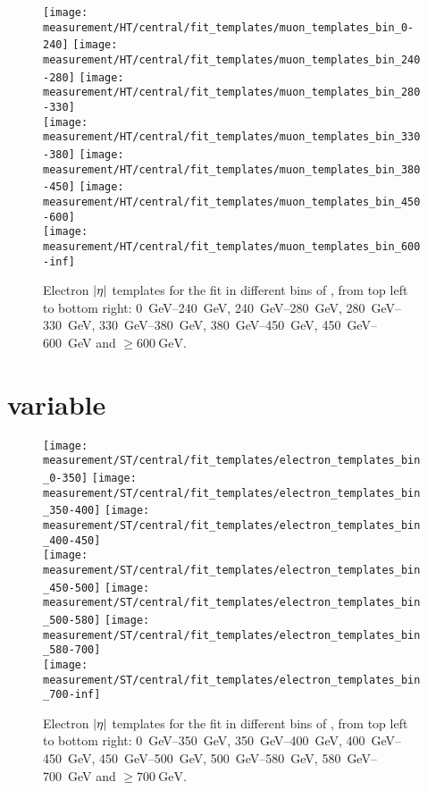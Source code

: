 \begin{figure}[!htbp]
	\centering
  	{\texttt{[image: measurement/HT/central/fit\_templates/muon\_templates\_bin\_0-240]}}
  	{\texttt{[image: measurement/HT/central/fit\_templates/muon\_templates\_bin\_240-280]}}
  	{\texttt{[image: measurement/HT/central/fit\_templates/muon\_templates\_bin\_280-330]}}\\
  	{\texttt{[image: measurement/HT/central/fit\_templates/muon\_templates\_bin\_330-380]}}
  	{\texttt{[image: measurement/HT/central/fit\_templates/muon\_templates\_bin\_380-450]}}
  	{\texttt{[image: measurement/HT/central/fit\_templates/muon\_templates\_bin\_450-600]}}\\
  	{\texttt{[image: measurement/HT/central/fit\_templates/muon\_templates\_bin\_600-inf]}}
    \caption{Electron $\lvert \eta \rvert$ templates for the fit in different bins of \HT,
    from top left to bottom right: \SIrange{0}{240}{\GeV}, \SIrange{240}{280}{\GeV},
    \SIrange{280}{330}{\GeV}, \SIrange{330}{380}{\GeV}, \SIrange{380}{450}{\GeV},
    \SIrange{450}{600}{\GeV} and $\geq \SI{600}{\GeV}$.}
    \label{fig:fit_templates_HT_muon}
\end{figure}

\newpage
\section*{\ST variable}

\begin{figure}[!htbp]
  \centering
    {\texttt{[image: measurement/ST/central/fit\_templates/electron\_templates\_bin\_0-350]}}
    {\texttt{[image: measurement/ST/central/fit\_templates/electron\_templates\_bin\_350-400]}}
    {\texttt{[image: measurement/ST/central/fit\_templates/electron\_templates\_bin\_400-450]}}\\
    {\texttt{[image: measurement/ST/central/fit\_templates/electron\_templates\_bin\_450-500]}}
    {\texttt{[image: measurement/ST/central/fit\_templates/electron\_templates\_bin\_500-580]}}
    {\texttt{[image: measurement/ST/central/fit\_templates/electron\_templates\_bin\_580-700]}}\\
    {\texttt{[image: measurement/ST/central/fit\_templates/electron\_templates\_bin\_700-inf]}}
    \caption{Electron $\lvert \eta \rvert$ templates for the fit in different bins of \ST,
    from top left to bottom right: \SIrange{0}{350}{\GeV}, \SIrange{350}{400}{\GeV},
    \SIrange{400}{450}{\GeV}, \SIrange{450}{500}{\GeV}, \SIrange{500}{580}{\GeV},
    \SIrange{580}{700}{\GeV} and $\geq \SI{700}{\GeV}$.}
    \label{fig:fit_tempaltes_ST_electron}
\end{figure}


